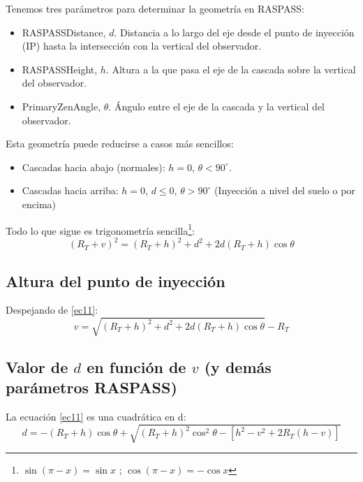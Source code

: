 \documentclass[a4paper,12pt]{article}
\numberwithin{equation}{section}
\numberwithin{figure}{section}
\begin{document}
	Tenemos tres parámetros para determinar la geometría en RASPASS:
	\begin{itemize}
		\item RASPASSDistance, $d$. Distancia a lo largo del eje desde el punto de inyección (IP) hasta la intersección con la vertical del observador.
		\item RASPASSHeight,  $h$. Altura a la que pasa el eje de la cascada sobre la vertical del observador.
		\item PrimaryZenAngle, $\theta$. Ángulo entre el eje de la cascada y la vertical del observador.
	\end{itemize}
Esta geometría puede reducirse a casos más sencillos:
\begin{itemize}
	\item Cascadas hacia abajo (normales): $h = 0$, $\theta<90^\circ$.
	\item Cascadas hacia arriba: $h = 0$, $d \leq 0$, $\theta >90^\circ$ (Inyección a nivel del suelo o por encima)
\end{itemize}
Todo lo que sigue es trigonometría sencilla\footnote{$\sin(\pi-x)=\sin{x}$ ; $\cos(\pi-x)=-\cos{x}$}:
\begin{equation}
	(R_T+v)^2=(R_T+h)^2+d^2+2d(R_T+h)\cos\theta
	\label{ec11}
\end{equation}
\newpage
\subsection{Altura del punto de inyección}
Despejando de \eqref{ec11}:
\begin{equation}
	v = \sqrt{(R_T+h)^2+d^2+2d(R_T+h)\cos\theta}-R_T
	\label{ec12}
\end{equation}
\subsection{Valor de $d$ en función de $v$ (y demás parámetros RASPASS)}
La ecuación \eqref{ec11} es una cuadrática en d:
\begin{equation}
	d=-(R_T+h)\cos\theta+\sqrt{(R_T+h)^2\cos^2\theta-\left[h^2-v^2+2R_T(h-v)\right]}
	\label{ec13}
\end{equation}
\end{document}
